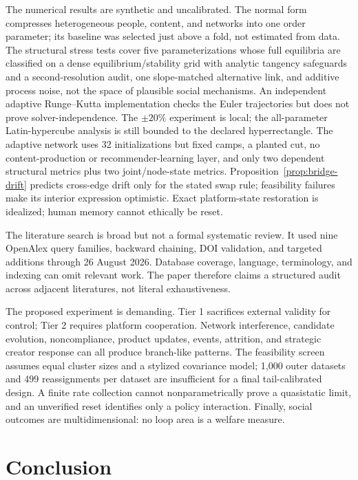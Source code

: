 \documentclass[10pt,a4paper]{article}
\begin{document}
The numerical results are synthetic and uncalibrated. The normal form compresses heterogeneous people, content, and networks into one order parameter; its baseline was selected just above a fold, not estimated from data. The structural stress tests cover five parameterizations whose full equilibria are classified on a dense equilibrium/stability grid with analytic tangency safeguards and a second-resolution audit, one slope-matched alternative link, and additive process noise, not the space of plausible social mechanisms. An independent adaptive Runge--Kutta implementation checks the Euler trajectories but does not prove solver-independence. The $\pm20\%$ experiment is local; the all-parameter Latin-hypercube analysis is still bounded to the declared hyperrectangle. The adaptive network uses 32 initializations but fixed camps, a planted cut, no content-production or recommender-learning layer, and only two dependent structural metrics plus two joint/node-state metrics. Proposition~\ref{prop:bridge-drift} predicts cross-edge drift only for the stated swap rule; feasibility failures make its interior expression optimistic. Exact platform-state restoration is idealized; human memory cannot ethically be reset.

The literature search is broad but not a formal systematic review. It used nine OpenAlex query families, backward chaining, DOI validation, and targeted additions through 26 August 2026. Database coverage, language, terminology, and indexing can omit relevant work. The paper therefore claims a structured audit across adjacent literatures, not literal exhaustiveness.

The proposed experiment is demanding. Tier 1 sacrifices external validity for control; Tier 2 requires platform cooperation. Network interference, candidate evolution, noncompliance, product updates, events, attrition, and strategic creator response can all produce branch-like patterns. The feasibility screen assumes equal cluster sizes and a stylized covariance model; 1,000 outer datasets and 499 reassignments per dataset are insufficient for a final tail-calibrated design. A finite rate collection cannot nonparametrically prove a quasistatic limit, and an unverified reset identifies only a policy interaction. Finally, social outcomes are multidimensional: no loop area is a welfare measure.

\section{Conclusion}
\end{document}
